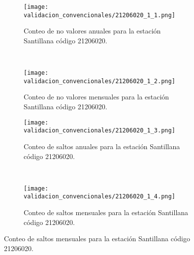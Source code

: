 \begin{figure}[H]\ContinuedFloat
\centering
	\begin{subfigure}[normla]{0.4\textwidth}
	\texttt{[image: validacion\_convencionales/21206020\_1\_1.png]}
		\caption{Conteo de no valores anuales para la estación Santillana    código 21206020.}
		\label{subfig:a1}
		\end{subfigure}
		~
    \begin{subfigure}[normla]{0.4\textwidth}
	\texttt{[image: validacion\_convencionales/21206020\_1\_2.png]}
		\caption{Conteo de no valores mensuales para la estación Santillana    código 21206020.}
		\label{subfig:a2}
		\end{subfigure}
		
    \begin{subfigure}[normla]{0.4\textwidth}
	\texttt{[image: validacion\_convencionales/21206020\_1\_3.png]}
		\caption{Conteo de saltos anuales para la estación Santillana    código 21206020.}
		\label{subfig:a1}
		\end{subfigure}
		~
    \begin{subfigure}[normla]{0.4\textwidth}
	\texttt{[image: validacion\_convencionales/21206020\_1\_4.png]}
		\caption{Conteo de saltos mensuales para la estación Santillana    código 21206020.}
		\label{subfig:a2}
		\end{subfigure}

	
\end{figure}
           
\begin{figure}[H]\ContinuedFloat
\centering
\end{figure}
           
